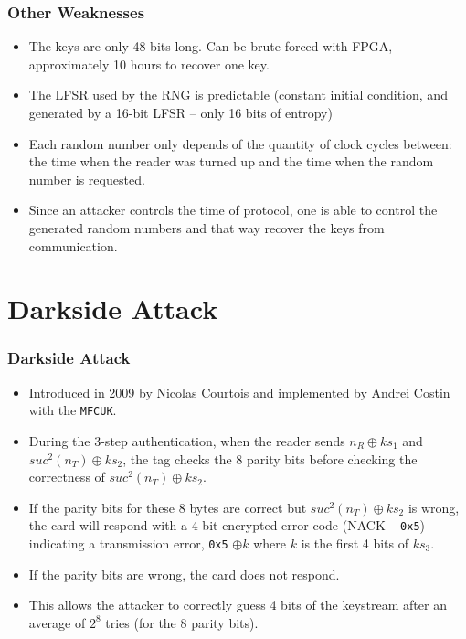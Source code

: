 \documentclass[12pt]{beamer}
\begin{document}
\begin{frame}
\frametitle{Other Weaknesses}
\begin{itemize}
  \item The keys are only 48-bits long. Can be brute-forced with FPGA, approximately 10 hours to recover one key.
  \item The LFSR used by the RNG is predictable (constant initial condition, and generated by a 16-bit LFSR -- only 16 bits of entropy)
  \item Each random number only depends of the quantity of clock cycles between: the time when the reader was turned up and the time when the random number is requested.
  \item Since an attacker controls the time of protocol, one is able to control the generated random numbers and that way recover the keys from communication.
\end{itemize}
\end{frame}

\section{Darkside Attack}
\begin{frame}
\frametitle{Darkside Attack}
\begin{itemize}
  \item Introduced in 2009 by Nicolas Courtois and implemented by Andrei Costin with the \texttt{MFCUK}.
  \item During the 3-step authentication, when the reader sends $n_R\oplus ks_1$ and $suc^2(n_T)\oplus ks_2$, the tag checks the 8 parity bits before checking the correctness of $suc^2(n_T)\oplus ks_2$.
  \item If the parity bits for these 8 bytes are correct but $suc^2(n_T)\oplus ks_2$ is wrong, the card will respond with a 4-bit encrypted error code (NACK -- \texttt{0x5}) indicating a transmission error, \texttt{0x5} $\oplus k$ where $k$ is the first 4 bits of $ks_3$.
  \item If the parity bits are wrong, the card does not respond.
  \item This allows the attacker to correctly guess 4 bits of the keystream after an average of $2^8$ tries (for the 8 parity bits).
\end{itemize}
\end{frame}
\end{document}
